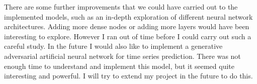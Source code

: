 \documentclass[10pt,a4paper]{article}
\begin{document}
There are some further improvements that we could have carried out to the implemented models, such as an in-depth exploration of different neural network architectures. Adding more dense nodes or adding more layers would have been interesting to explore. However I ran out of time before I could carry out such a careful study. In the future I would also like to implement a generative adversarial artificial neural network for time series prediction. There was not enough time to understand and implement this model, but it seemed quite interesting and powerful. I will try to extend my project in the future to do this.


%
\end{document}
